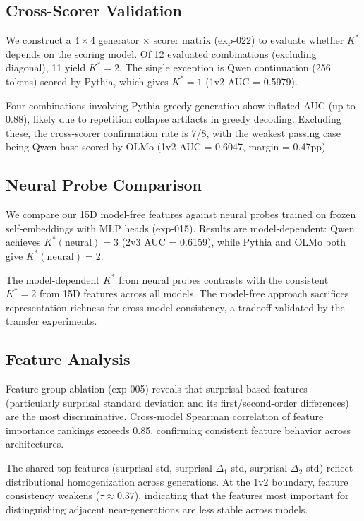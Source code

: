 \documentclass[11pt,a4paper]{article}
\begin{document}
\subsection{Cross-Scorer Validation}
\label{sec:crossscorer}

We construct a $4 \times 4$ generator $\times$ scorer matrix (exp-022) to evaluate whether $K^*$ depends on the scoring model. Of 12 evaluated combinations (excluding diagonal), 11 yield $K^* = 2$. The single exception is Qwen continuation (256 tokens) scored by Pythia, which gives $K^* = 1$ (1v2 AUC = 0.5979).

Four combinations involving Pythia-greedy generation show inflated AUC (up to 0.88), likely due to repetition collapse artifacts in greedy decoding. Excluding these, the cross-scorer confirmation rate is 7/8, with the weakest passing case being Qwen-base scored by OLMo (1v2 AUC = 0.6047, margin = 0.47pp).

\subsection{Neural Probe Comparison}
\label{sec:neural}

We compare our 15D model-free features against neural probes trained on frozen self-embeddings with MLP heads (exp-015). Results are model-dependent: Qwen achieves $K^*(\text{neural}) = 3$ (2v3 AUC = 0.6159), while Pythia and OLMo both give $K^*(\text{neural}) = 2$.

The model-dependent $K^*$ from neural probes contrasts with the consistent $K^* = 2$ from 15D features across all models. The model-free approach sacrifices representation richness for cross-model consistency, a tradeoff validated by the transfer experiments.

\subsection{Feature Analysis}
\label{sec:features}

Feature group ablation (exp-005) reveals that surprisal-based features (particularly surprisal standard deviation and its first/second-order differences) are the most discriminative. Cross-model Spearman correlation of feature importance rankings exceeds 0.85, confirming consistent feature behavior across architectures.

The shared top features (surprisal std, surprisal $\Delta_1$ std, surprisal $\Delta_2$ std) reflect distributional homogenization across generations. At the 1v2 boundary, feature consistency weakens ($\tau \approx 0.37$), indicating that the features most important for distinguishing adjacent near-generations are less stable across models.
\end{document}
